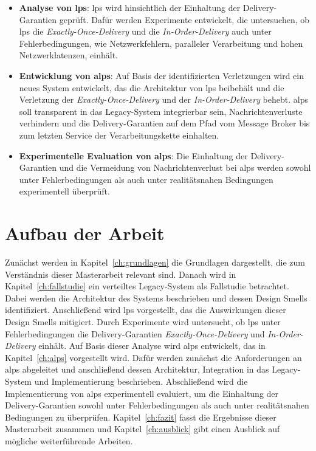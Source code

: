 \begin{itemize}
      \item \textbf{Analyse von \gls{lps}}: \gls{lps} wird hinsichtlich der Einhaltung der Delivery-Garantien geprüft. Dafür werden Experimente entwickelt, die untersuchen, ob \gls{lps} die \textit{Exactly-Once-Delivery} und die \textit{In-Order-Delivery} auch unter Fehlerbedingungen, wie Netzwerkfehlern, paralleler Verarbeitung und hohen Netzwerklatenzen, einhält.

      \item \textbf{Entwicklung von \gls{alps}}: Auf Basis der identifizierten Verletzungen wird ein neues System entwickelt, das die Architektur von \gls{lps} beibehält und die Verletzung der \textit{Exactly-Once-Delivery} und der \textit{In-Order-Delivery} behebt. \gls{alps} soll transparent in das Legacy-System integrierbar sein, Nachrichtenverluste verhindern und die Delivery-Garantien auf dem Pfad vom Message Broker bis zum letzten Service der Verarbeitungskette einhalten.

      \item \textbf{Experimentelle Evaluation von \gls{alps}}: Die Einhaltung der Delivery-Garantien und die Vermeidung von Nachrichtenverlust bei \gls{alps} werden sowohl unter Fehlerbedingungen als auch unter realitätsnahen Bedingungen experimentell überprüft.
\end{itemize}

\newpage

\section{Aufbau der Arbeit}
\label{sec:aufbau}

Zunächst werden in Kapitel~\ref{ch:grundlagen} die Grundlagen dargestellt, die zum Verständnis dieser Masterarbeit relevant sind. Danach wird in Kapitel~\ref{ch:fallstudie} ein verteiltes Legacy-System als Fallstudie betrachtet. Dabei werden die Architektur des Systems beschrieben und dessen Design Smells identifiziert. Anschließend wird \gls{lps} vorgestellt, das die Auswirkungen dieser Design Smells mitigiert. Durch Experimente wird untersucht, ob \gls{lps} unter Fehlerbedingungen die Delivery-Garantien \textit{Exactly-Once-Delivery} und \textit{In-Order-Delivery} einhält. Auf Basis dieser Analyse wird \gls{alps} entwickelt, das in Kapitel~\ref{ch:alps} vorgestellt wird. Dafür werden zunächst die Anforderungen an \gls{alps} abgeleitet und anschließend dessen Architektur, Integration in das Legacy-System und Implementierung beschrieben. Abschließend wird die Implementierung von \gls{alps} experimentell evaluiert, um die Einhaltung der Delivery-Garantien sowohl unter Fehlerbedingungen als auch unter realitätsnahen Bedingungen zu überprüfen. Kapitel~\ref{ch:fazit} fasst die Ergebnisse dieser Masterarbeit zusammen und Kapitel~\ref{ch:ausblick} gibt einen Ausblick auf mögliche weiterführende Arbeiten.